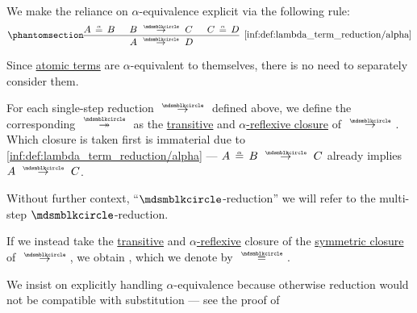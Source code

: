 \begin{definition}
\begin{thmenum}
    We make the reliance on \( \alpha \)-equivalence explicit via the following rule:
    \begin{equation*}\taglabel[\ensuremath{ \logic{Alpha}_{\Anon} }]{inf:def:lambda_term_reduction/alpha}
      \begin{prooftree}
        \hypo{ A \aequiv B }
        \hypo{ B \pred C }
        \hypo{ C \aequiv D }
        \infer3[\ref{inf:def:lambda_term_reduction/alpha}]{ A \pred D }.
      \end{prooftree}
    \end{equation*}

    Since \hyperref[def:lambda_term/atom]{atomic terms} are \( \alpha \)-equivalent to themselves, there is no need to separately consider them.

     For each single-step reduction \( {\pred} \) defined above, we define the corresponding  \( {\pred*} \) as the \hyperref[def:relation_closures/transitive]{transitive} and \hyperref[def:alpha_reflexive]{\( \alpha \)-reflexive closure} of \( {\pred} \). Which closure is taken first is immaterial due to \ref{inf:def:lambda_term_reduction/alpha} --- \( A \aequiv B \pred C \) already implies \( A \pred C \).

    Without further context, \enquote{\( {\Anon} \)-reduction} we will refer to the multi-step \( {\Anon} \)-reduction.

     If we instead take the
    \hyperref[def:relation_closures/transitive]{transitive} and \hyperref[def:alpha_reflexive]{\( \alpha \)-reflexive} closure of the \hyperref[def:relation_closures/symmetric]{symmetric closure} of \( \pred \), we obtain , which we denote by \( {\equivrel{\Anon}} \).
  \end{thmenum}
\end{definition}
\begin{comments}
  \item We insist on explicitly handling \( \alpha \)-equivalence because otherwise reduction would not be compatible with substitution --- see the proof of 
\end{comments}

